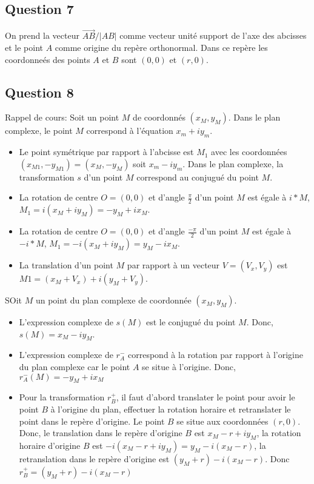 \documentclass[]{book}
\theoremstyle{definition}
\begin{document}
\subsection*{Question 7}
On prend la vecteur $\overrightarrow{AB}/|AB|$ comme vecteur unit\'e support de l'axe des abcisses et le point $A$ comme origine du rep\`ere orthonormal. Dans ce rep\`ere les coordonne\'es des points $A$ et $B$ sont $(0,0)$ et $(r,0)$. 


\subsection*{Question 8}

Rappel de cours: Soit un point $M$ de coordonn\'es $(x_M,y_M)$. Dans le plan complexe, le point $M$ correspond \`a l'\'equation $x_m + iy_m$. 
\begin{itemize}
\item Le point sym\'etrique par rapport \`a l'abcisse est $M_1$ avec les coordonn\'ees $(x_{M1},-y_{M1}) =(x_M,-y_M)$ soit $x_m - iy_m$. Dans le plan complexe, la transformation $s$ d'un point $M$ correspond au conjugu\'e du point $M$.
\item La rotation de centre $O = (0,0)$ et d'angle $\frac{\pi}{2}$ d'un point $M$ est \'egale \`a $i*M$, $M_1 = i (x_M + iy_M) = -y_M + i x_M$.  
\item La rotation de centre $O = (0,0)$ et d'angle $\frac{-\pi}{2}$ d'un point $M$ est \'egale \`a $-i*M$, $M_1 = -i (x_M + i y_M) = y_M - ix_M$.  
\item La translation d'un point $M$ par rapport \`a un vecteur $V=(V_x, V_y)$ est $M1 = (x_M+V_x) + i(y_M+V_y)$.
\end{itemize}


SOit $M$ un point du plan complexe de coordonn\'ee $(x_M, y_M)$.\\

\begin{itemize}
\item L'expression complexe de $s(M)$ est le conjugu\'e du point $M$. Donc, $s(M) = x_M - iy_M$.
\item L'expression complexe de $r^{-}_A$ correspond \`a la rotation par rapport \`a l'origine du plan complexe car le point $A$ se situe \`a l'origine. Donc, $r^{-}_A(M) = - y_M + ix_M $
\item Pour la transformation $r^{+}_B$, il faut d'abord translater le point pour avoir le point $B$ \`a l'origine du plan, effectuer la rotation horaire et retranslater le point dans le rep\`ere d'origine. Le point $B$ se situe aux coordonn\'ees $(r,0)$. Donc, le translation dans le rep\`ere d'origine $B$ est $x_M-r + iy_M$, la rotation horaire d'origine $B$ est $-i(x_M-r + iy_M)= y_M -i(x_M-r)$, la retranslation dans le rep\`ere d'origine est $(y_M+r) -i(x_M-r)$. Donc $r^{+}_B = (y_M+r) -i(x_M-r)$ 
\end{itemize}
\end{document}

